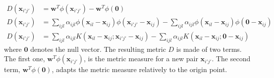 \begin{align}
D(\textbf{x}_{i'j'}) & = \textbf{w}^T \phi(\textbf{x}_{i'j'}) - \textbf{w}^T \phi(\textbf{0})\\
D(\textbf{x}_{i'j'}) &= \sum\limits_{ijl} \alpha_{ijl} 
\phi(
\textbf{x}_{il}-\textbf{x}_{ij}
)
\phi(	
\textbf{x}_{i'j'}-\textbf{x}_{ij}
) 
-
\sum\limits_{ijl} \alpha_{ijl} 
\phi(
\textbf{x}_{il}-\textbf{x}_{ij}
)
\phi(	
\textbf{0}-\textbf{x}_{ij}
) 				
\\
D(\textbf{x}_{i'j'}) &= \sum\limits_{ijl} \alpha_{ijl} 
K
\left( 
\textbf{x}_{il}-\textbf{x}_{ij}
;	
\textbf{x}_{i'j'}-\textbf{x}_{ij}
\right) 		
-
\sum\limits_{ijl} \alpha_{ijl} 
K
\left( 
\textbf{x}_{il}-\textbf{x}_{ij}
;	
\textbf{0}-\textbf{x}_{ij}
\right) 		
\label{Eq:nonlinearD}		
\end{align}
\noindent where $\textbf{0}$ denotes the null vector. The resulting metric $D$ is made of two terms. The first one, $\textbf{w}^T \phi(\textbf{x}_{i'j'})$, is the metric measure for a new pair $\textbf{x}_{i'j'}$. The second term, $\textbf{w}^T \phi(\textbf{0})$, adapts the metric measure relatively to the origin point. 

